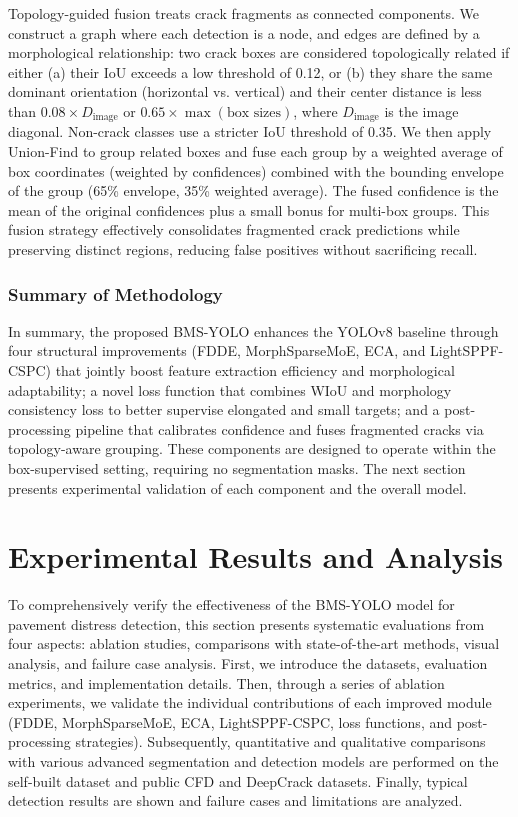\documentclass[twocolumn]{sn-jnl}
\begin{document}
	Topology-guided fusion treats crack fragments as connected components. We construct a graph where each detection is a node, and edges are defined by a morphological relationship: two crack boxes are considered topologically related if either (a) their IoU exceeds a low threshold of 0.12, or (b) they share the same dominant orientation (horizontal vs. vertical) and their center distance is less than \(0.08 \times D_{\text{image}}\) or \(0.65 \times \max(\text{box sizes})\), where \(D_{\text{image}}\) is the image diagonal. Non-crack classes use a stricter IoU threshold of 0.35. We then apply Union-Find to group related boxes and fuse each group by a weighted average of box coordinates (weighted by confidences) combined with the bounding envelope of the group (65\% envelope, 35\% weighted average). The fused confidence is the mean of the original confidences plus a small bonus for multi-box groups. This fusion strategy effectively consolidates fragmented crack predictions while preserving distinct regions, reducing false positives without sacrificing recall.
	
	\subsubsection{Summary of Methodology}
	In summary, the proposed BMS-YOLO enhances the YOLOv8 baseline through four structural improvements (FDDE, MorphSparseMoE, ECA, and LightSPPF-CSPC) that jointly boost feature extraction efficiency and morphological adaptability; a novel loss function that combines WIoU and morphology consistency loss to better supervise elongated and small targets; and a post-processing pipeline that calibrates confidence and fuses fragmented cracks via topology-aware grouping. These components are designed to operate within the box-supervised setting, requiring no segmentation masks. The next section presents experimental validation of each component and the overall model.
	
	\section{Experimental Results and Analysis}
	To comprehensively verify the effectiveness of the BMS-YOLO model for pavement distress detection, this section presents systematic evaluations from four aspects: ablation studies, comparisons with state-of-the-art methods, visual analysis, and failure case analysis. First, we introduce the datasets, evaluation metrics, and implementation details. Then, through a series of ablation experiments, we validate the individual contributions of each improved module (FDDE, MorphSparseMoE, ECA, LightSPPF-CSPC, loss functions, and post-processing strategies). Subsequently, quantitative and qualitative comparisons with various advanced segmentation and detection models are performed on the self-built dataset and public CFD and DeepCrack datasets. Finally, typical detection results are shown and failure cases and limitations are analyzed.
	
\end{document}
